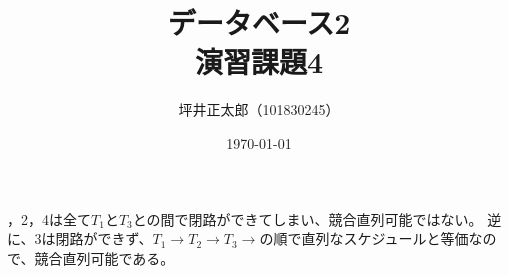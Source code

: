 \documentclass[a4paper,10pt]{jsarticle}
\begin{document}
\title{データベース2\\演習課題4}
\author{坪井正太郎（101830245）}
\date{\today}
，2，4は全て\(T_1とT_3\)との間で閉路ができてしまい、競合直列可能ではない。
逆に、3は閉路ができず、\(T_1\rightarrow T_2\rightarrow T_3\rightarrow\)の順で直列なスケジュールと等価なので、競合直列可能である。
\end{document}
